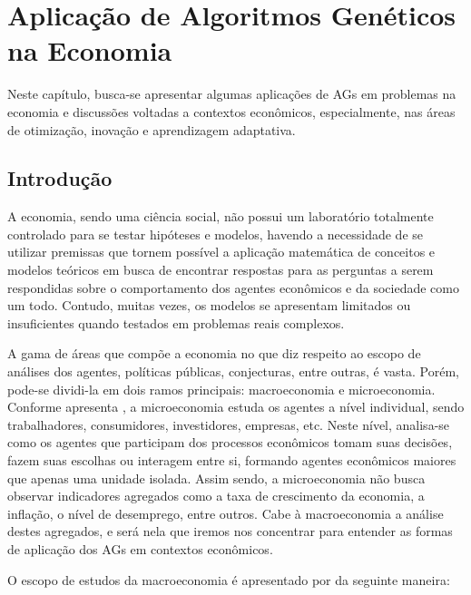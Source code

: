 \chapter{Aplicação de Algoritmos Genéticos na Economia}

Neste capítulo, busca-se apresentar algumas aplicações de AGs em problemas na economia e discussões voltadas a contextos econômicos, especialmente, nas áreas de otimização, inovação e aprendizagem adaptativa.

\section{Introdução}

A economia, sendo uma ciência social, não possui um laboratório totalmente controlado para se testar hipóteses e modelos, havendo a necessidade de se utilizar premissas que tornem possível a aplicação matemática de conceitos e modelos teóricos em busca de encontrar respostas para as perguntas a serem respondidas sobre o comportamento dos agentes econômicos e da sociedade como um todo. Contudo, muitas vezes, os modelos se apresentam limitados ou insuficientes quando testados em problemas reais complexos.

A gama de áreas que compõe a economia no que diz respeito ao escopo de análises dos agentes, políticas públicas, conjecturas, entre outras, é vasta. Porém, pode-se dividi-la em dois ramos principais: macroeconomia e microeconomia. Conforme apresenta \citet[pg.3]{pindyck_microeconomia_2013}, a microeconomia estuda os agentes a nível individual, sendo trabalhadores, consumidores, investidores, empresas, etc. Neste nível, analisa-se como os agentes que participam dos processos econômicos tomam suas decisões, fazem suas escolhas ou interagem entre si, formando agentes econômicos maiores que apenas uma unidade isolada. Assim sendo, a microeconomia não busca observar indicadores agregados como a taxa de crescimento da economia, a inflação, o nível de desemprego, entre outros. Cabe à macroeconomia a análise destes agregados, e será nela que iremos nos concentrar para entender as formas de aplicação dos AGs em contextos econômicos.

O escopo de estudos da macroeconomia é apresentado por \citeauthor*{snowdon_modern_2005} da seguinte maneira:

